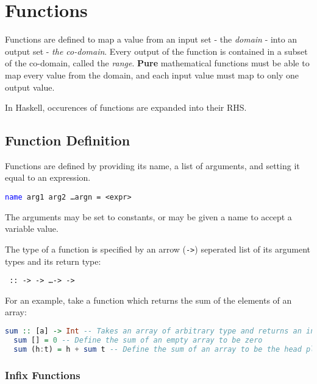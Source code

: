 \section{Functions}

Functions are defined to map a value from an input set - the \textit{domain} - into an output set - \textit{the co-domain}. Every output of the function is contained in a subset of the co-domain, called the \textit{range}. \textbf{Pure} mathematical functions must be able to map every value from the domain, and each input value must map to only one output value.

In Haskell, occurences of functions are expanded into their RHS.

\subsection{Function Definition}

Functions are defined by providing its name, a list of arguments, and setting it equal to an expression.

\begin{center}
  \texttt{\textcolor{blue}{name} arg1 arg2 \ldots argn = <expr>}
\end{center}

The arguments may be set to constants, or may be given a name to accept a variable value.

The type of a function is specified by an arrow (\texttt{->}) seperated list of its argument types and its return type:

\begin{center}
  \texttt{ ::  ->  -> \ldots ->  -> }
\end{center}

For an example, take a function which returns the sum of the elements of an array:

\begin{lstlisting}[language=haskell]
  sum :: [a] -> Int -- Takes an array of arbitrary type and returns an integer
  sum [] = 0 -- Define the sum of an empty array to be zero
  sum (h:t) = h + sum t -- Define the sum of an array to be the head plus the sum of the tail
\end{lstlisting}

\subsubsection{Infix Functions}


